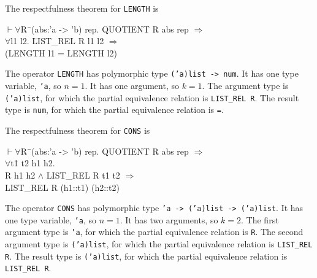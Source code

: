 \documentclass[envcountsame,runningheads]{llncs}
\newcommand{\quotient}{partial equivalence}
\begin{document}
\pagebreak[2]
The respectfulness theorem for {\tt LENGTH} is
{\tt \begin{tabbing}
\hspace{5.5mm}
    $\vdash \forall$R\=\ (abs:'a -> 'b) rep. QUOTIENT R abs rep $\Rightarrow$ \\
\>       $\forall$l1 l2. \=LIST\_REL R l1 l2 $\Rightarrow$ \\
\>\>             (LENGTH l1 = LENGTH l2)
\end{tabbing}}
The operator {\tt LENGTH} has polymorphic type {\tt ('a)list -> num}. 
It has one type variable, {\tt 'a}, so $n = 1$. 
It has one argument, so $k = 1$.
The argument type is
{\tt ('a)list},
for which
the \quotient{} relation
is {\tt LIST\_REL R}.
The result type is
{\tt num},
for which
the \quotient{} relation
is {\tt =}.

The respectfulness theorem for {\tt CONS} is
{\tt \begin{tabbing}
\hspace{5.5mm}
    $\vdash \forall$R\=\ (abs:'a -> 'b) rep. QUOTIENT R abs rep $\Rightarrow$ \\
\>       $\forall$t\=1 t2 h1 h2. \\
\>\>       R h1 h2 $\wedge$ LIST\_REL R t1 t2 $\Rightarrow$ \\
\>\>       LIST\_REL R (h1::t1) (h2::t2)
\end{tabbing}}
The operator {\tt CONS} has polymorphic type {\tt 'a -> ('a)list -> ('a)list}. 
It has one type variable, {\tt 'a}, so $n = 1$. 
It has two arguments, so $k = 2$.
The first argument type is
{\tt 'a},
for which
the \quotient{} relation
is {\tt R}.
The second argument type is
{\tt ('a)list},
for which
the \quotient{} relation
is {\tt LIST\_REL R}.
The result type is
{\tt ('a)list},
for which
the \quotient{} relation
is {\tt LIST\_REL R}.
\end{document}

